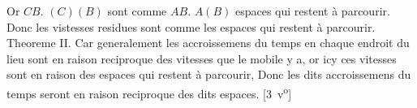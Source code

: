 Or $\displaystyle CB.$ $\displaystyle (C)(B)$ sont
comme $\displaystyle AB.$ $\displaystyle A(B)$ espaces qui restent \`{a} parcourir.
Donc les vistesses residues sont comme les espaces qui restent \`{a} parcourir.
\pend
\pstart%
Theoreme II.
\pend
\pstart
\sloppy
\noindent%
\pend
\count{}
\count{}
\pstart
\noindent%
Car generalement les accroissemens du temps en chaque endroit du lieu
sont en raison reciproque des vitesses que le mobile y a,
or icy ces vitesses sont en raison des espaces qui restent \`{a} parcourir,
Donc les dits accroissemens du temps seront en raison reciproque des dits espaces.
[3~v\textsuperscript{o}]
\pend 